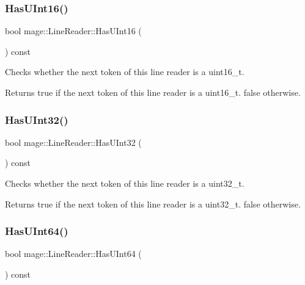 \subsubsection{\texorpdfstring{Has\+U\+Int16()}{HasUInt16()}}
{\footnotesize\ttfamily bool mage\+::\+Line\+Reader\+::\+Has\+U\+Int16 (\begin{DoxyParamCaption}{ }\end{DoxyParamCaption}) const\hspace{0.3cm}{\ttfamily [protected]}}

Checks whether the next token of this line reader is a {\ttfamily uint16\+\_\+t}.

\begin{DoxyReturn}{Returns}
{\ttfamily true} if the next token of this line reader is a {\ttfamily uint16\+\_\+t}. {\ttfamily false} otherwise. 
\end{DoxyReturn}
\hypertarget{classmage_1_1_line_reader_a56f82d5562d0254ec59871a3bb7ad837}{}\label{classmage_1_1_line_reader_a56f82d5562d0254ec59871a3bb7ad837} 
\subsubsection{\texorpdfstring{Has\+U\+Int32()}{HasUInt32()}}
{\footnotesize\ttfamily bool mage\+::\+Line\+Reader\+::\+Has\+U\+Int32 (\begin{DoxyParamCaption}{ }\end{DoxyParamCaption}) const\hspace{0.3cm}{\ttfamily [protected]}}

Checks whether the next token of this line reader is a {\ttfamily uint32\+\_\+t}.

\begin{DoxyReturn}{Returns}
{\ttfamily true} if the next token of this line reader is a {\ttfamily uint32\+\_\+t}. {\ttfamily false} otherwise. 
\end{DoxyReturn}
\hypertarget{classmage_1_1_line_reader_ad311b6edbfc68c01997f90cd1db5d95e}{}\label{classmage_1_1_line_reader_ad311b6edbfc68c01997f90cd1db5d95e} 
\subsubsection{\texorpdfstring{Has\+U\+Int64()}{HasUInt64()}}
{\footnotesize\ttfamily bool mage\+::\+Line\+Reader\+::\+Has\+U\+Int64 (\begin{DoxyParamCaption}{ }\end{DoxyParamCaption}) const\hspace{0.3cm}{\ttfamily [protected]}}

